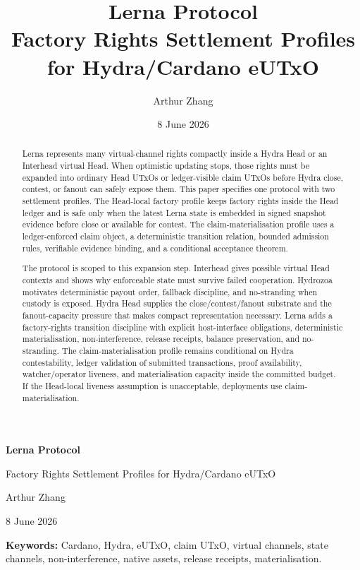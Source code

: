 \documentclass[a4paper,11pt]{article}
\title{\textbf{Lerna Protocol}\\
\large Factory Rights Settlement Profiles for Hydra/Cardano eUTxO}
\author{Arthur Zhang}
\date{8 June 2026}
\theoremstyle{definition}
\theoremstyle{plain}
\theoremstyle{remark}
\begin{document}

\begin{titlepage}
\centering
\vspace*{1.1cm}
{\sffamily\bfseries\LARGE Lerna Protocol\par}
\vspace{0.35cm}
{\sffamily\large Factory Rights Settlement Profiles for Hydra/Cardano eUTxO\par}
\vspace{1.2cm}
{\normalsize Arthur Zhang\par}
\vspace{0.2cm}
{\normalsize 8 June 2026\par}
\vspace{1.2cm}

\begin{abstract}
\noindent
Lerna represents many virtual-channel rights compactly inside a Hydra Head or
an Interhead virtual Head. When optimistic updating stops, those rights must be
expanded into ordinary Head UTxOs or ledger-visible claim UTxOs before Hydra
close, contest, or fanout can safely expose them. This paper specifies one
protocol with two settlement profiles. The Head-local factory profile keeps
factory rights inside the Head ledger and is safe only when the latest Lerna
state is embedded in signed snapshot evidence before close or available for
contest. The claim-materialisation profile uses a ledger-enforced claim object,
a deterministic transition relation, bounded admission rules, verifiable
evidence binding, and a conditional acceptance theorem.

\medskip
\noindent
The protocol is scoped to this expansion step. Interhead gives possible virtual
Head contexts and shows why enforceable state must survive failed cooperation.
Hydrozoa motivates deterministic payout order, fallback discipline, and
no-stranding when custody is exposed. Hydra Head supplies the
close/contest/fanout substrate and the fanout-capacity pressure that makes
compact representation necessary. Lerna adds a factory-rights transition
discipline with explicit host-interface obligations, deterministic
materialisation, non-interference, release receipts, balance preservation, and
no-stranding. The claim-materialisation profile remains conditional on Hydra
contestability, ledger validation of submitted transactions, proof
availability, watcher/operator liveness, and materialisation capacity inside
the committed budget. If the Head-local liveness assumption is unacceptable,
deployments use claim-materialisation.
\end{abstract}

\vfill
\begin{flushleft}
\textbf{Keywords:} Cardano, Hydra, eUTxO, claim UTxO, virtual channels, state
channels, non-interference, native assets, release receipts, materialisation.
\end{flushleft}
\end{titlepage}
\end{document}

